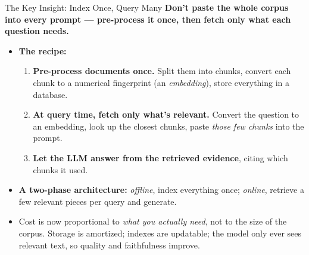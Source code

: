 \begin{frame}{The Key Insight: Index Once, Query Many}
\textbf{Don't paste the whole corpus into every prompt --- pre-process it once, then fetch only what each question needs.}

\medskip
\begin{itemize}
\item \textbf{The recipe:}
\begin{enumerate}
    \item \textbf{Pre-process documents once.} Split them into chunks, convert each chunk to a numerical fingerprint (an \emph{embedding}), store everything in a database.
    \item \textbf{At query time, fetch only what's relevant.} Convert the question to an embedding, look up the closest chunks, paste \emph{those few chunks} into the prompt.
    \item \textbf{Let the LLM answer from the retrieved evidence}, citing which chunks it used.
\end{enumerate}

\medskip
\item \textbf{A two-phase architecture:} \emph{offline}, index everything once; \emph{online}, retrieve a few relevant pieces per query and generate.

\medskip
\item Cost is now proportional to \emph{what you actually need}, not to the size of the corpus. Storage is amortized; indexes are updatable; the model only ever sees relevant text, so quality and faithfulness improve.
\end{itemize}
\end{frame}

